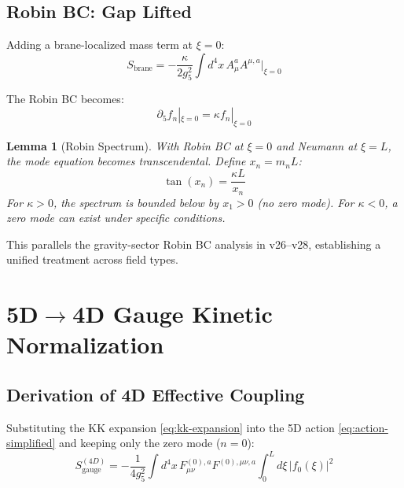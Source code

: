 \documentclass[11pt,a4paper]{article}
\newtheorem{lemma}[theorem]{Lemma}
\begin{document}
\subsection{Robin BC: Gap Lifted}

Adding a brane-localized mass term at $\xi = 0$:
\begin{equation}
  S_{\text{brane}} = -\frac{\kappa}{2g_5^2} \int d^4x \, A_\mu^a A^{\mu,a}|_{\xi=0}
  \label{eq:robin-brane}
\end{equation}

The Robin BC becomes:
\begin{equation}
  \partial_5 f_n|_{\xi=0} = \kappa f_n|_{\xi=0}
  \label{eq:robin-bc}
\end{equation}

\begin{lemma}[Robin Spectrum]
\label{lem:robin-spectrum}
With Robin BC at $\xi=0$ and Neumann at $\xi=L$, the mode equation becomes
transcendental. Define $x_n = m_n L$:
\begin{equation}
  \tan(x_n) = \frac{\kappa L}{x_n}
  \label{eq:robin-transcendental}
\end{equation}
For $\kappa > 0$, the spectrum is bounded below by $x_1 > 0$ (no zero mode).
For $\kappa < 0$, a zero mode can exist under specific conditions.
\end{lemma}

This parallels the gravity-sector Robin BC analysis in v26--v28, establishing a
unified treatment across field types.

\section{5D$\to$4D Gauge Kinetic Normalization}
\label{sec:gauge-normalization}

\subsection{Derivation of 4D Effective Coupling}

Substituting the KK expansion \eqref{eq:kk-expansion} into the 5D action
\eqref{eq:action-simplified} and keeping only the zero mode ($n=0$):
\begin{equation}
  S_{\text{gauge}}^{(4D)} = -\frac{1}{4g_5^2} \int d^4x \, F_{\mu\nu}^{(0),a} F^{(0),\mu\nu,a}
    \int_0^L d\xi \, |f_0(\xi)|^2
  \label{eq:4d-action-raw}
\end{equation}
\end{document}
